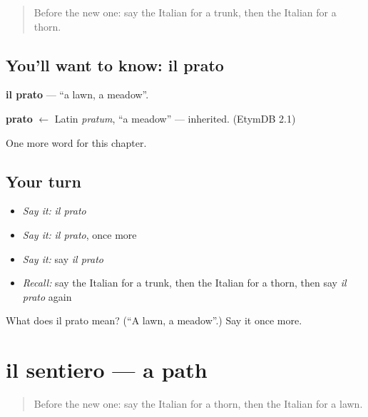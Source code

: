 \label{lesson:IT-C200-prato}



\begin{quote}
Before the new one: say the Italian for a trunk, then the Italian for a thorn.
\end{quote}

\subsection*{You'll want to know: il prato}
\textbf{il prato} — \textquotedblleft{}a lawn, a meadow\textquotedblright{}.

\begin{cousinweb}
\textbf{prato} $\leftarrow$ Latin \emph{pratum}, \textquotedblleft{}a meadow\textquotedblright{} — inherited. (EtymDB 2.1)
\end{cousinweb}

\begin{grammarlens}[title={What you've built}]
One more word for this chapter.
\end{grammarlens}

\subsection*{Your turn}
\begin{itemize}
\raggedright
  \item \emph{Say it:} \emph{il prato}
  \item \emph{Say it:} \emph{il prato}, once more
  \item \emph{Say it:} say \emph{il prato}
  \item \emph{Recall:} say the Italian for a trunk, then the Italian for a thorn, then say \emph{il prato} again
\end{itemize}

\begin{tcolorbox}[breakable,colback=teal!4,colframe=teal!35!black,title={Before you move on}]
What does il prato mean? (\textquotedblleft{}A lawn, a meadow\textquotedblright{}.) Say it once more.
\end{tcolorbox}
\section[il sentiero]{il sentiero — a path}

\label{lesson:IT-C200-sentiero}



\begin{quote}
Before the new one: say the Italian for a thorn, then the Italian for a lawn.
\end{quote}


